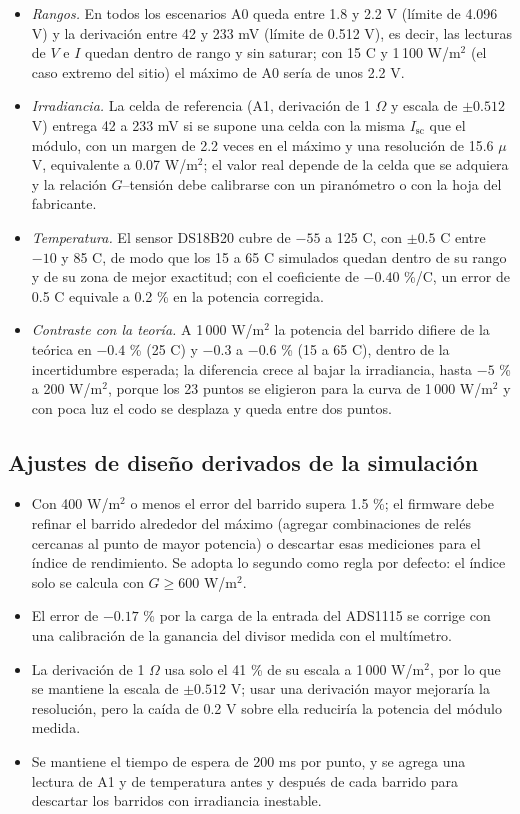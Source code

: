 \documentclass[10pt,letterpaper,twocolumn]{article}
\begin{document}
\begin{itemize}
\item \emph{Rangos.} En todos los escenarios A0 queda entre 1.8 y 2.2 V (límite de 4.096 V) y la derivación entre 42 y 233 mV (límite de 0.512 V), es decir, las lecturas de $V$ e $I$ quedan dentro de rango y sin saturar; con 15 \textdegree C y 1\,100 W/m$^2$ (el caso extremo del sitio) el máximo de A0 sería de unos 2.2 V.
\item \emph{Irradiancia.} La celda de referencia (A1, derivación de 1 $\Omega$ y escala de $\pm 0.512$ V) entrega 42 a 233 mV si se supone una celda con la misma $I_\mathrm{sc}$ que el módulo, con un margen de 2.2 veces en el máximo y una resolución de 15.6 $\mu$V, equivalente a 0.07 W/m$^2$; el valor real depende de la celda que se adquiera y la relación $G$--tensión debe calibrarse con un piranómetro o con la hoja del fabricante.
\item \emph{Temperatura.} El sensor DS18B20 \cite{ds18b20} cubre de $-55$ a 125 \textdegree C, con $\pm 0.5$ \textdegree C entre $-10$ y 85 \textdegree C, de modo que los 15 a 65 \textdegree C simulados quedan dentro de su rango y de su zona de mejor exactitud; con el coeficiente de $-0.40$ \%/\textdegree C, un error de 0.5 \textdegree C equivale a 0.2 \% en la potencia corregida.
\item \emph{Contraste con la teoría.} A 1\,000 W/m$^2$ la potencia del barrido difiere de la teórica en $-0.4$ \% (25 \textdegree C) y $-0.3$ a $-0.6$ \% (15 a 65 \textdegree C), dentro de la incertidumbre esperada; la diferencia crece al bajar la irradiancia, hasta $-5$ \% a 200 W/m$^2$, porque los 23 puntos se eligieron para la curva de 1\,000 W/m$^2$ y con poca luz el codo se desplaza y queda entre dos puntos.
\end{itemize}

\subsection{Ajustes de diseño derivados de la simulación}
\begin{itemize}
\item Con 400 W/m$^2$ o menos el error del barrido supera 1.5 \%; el firmware debe refinar el barrido alrededor del máximo (agregar combinaciones de relés cercanas al punto de mayor potencia) o descartar esas mediciones para el índice de rendimiento. Se adopta lo segundo como regla por defecto: el índice solo se calcula con $G\ge 600$ W/m$^2$.
\item El error de $-0.17$ \% por la carga de la entrada del ADS1115 se corrige con una calibración de la ganancia del divisor medida con el multímetro.
\item La derivación de 1 $\Omega$ usa solo el 41 \% de su escala a 1\,000 W/m$^2$, por lo que se mantiene la escala de $\pm 0.512$ V; usar una derivación mayor mejoraría la resolución, pero la caída de 0.2 V sobre ella reduciría la potencia del módulo medida.
\item Se mantiene el tiempo de espera de 200 ms por punto, y se agrega una lectura de A1 y de temperatura antes y después de cada barrido para descartar los barridos con irradiancia inestable.
\end{itemize}
\end{document}
